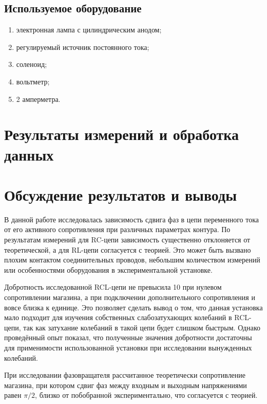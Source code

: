 \documentclass[a4paper, 12pt]{article}
\begin{document}
\subsection{Используемое оборудование}

\begin{enumerate}
    \item электронная лампа с цилиндрическим анодом;
    \item регулируемый источник постоянного тока;
    \item соленоид;
    \item вольтметр;
    \item 2 амперметра.
\end{enumerate}

\section{Результаты измерений и обработка данных}



\section{Обсуждение результатов и выводы}

В данной работе исследовалась зависимость сдвига фаз в цепи переменного тока от его активного сопротивления при различных параметрах контура. По результатам измерений для RC-цепи зависимость существенно отклоняется от теоретической, а для RL-цепи согласуется с теорией. Это может быть вызвано плохим контактом соединительных проводов, небольшим количеством измерений или особенностями оборудования в экспериментальной установке.

Добротность исследованной RCL-цепи не превысила 10 при нулевом сопротивлении магазина, а при подключении дополнительного сопротивления и вовсе близка к единице. Это позволяет сделать вывод о том, что данная установка мало подходит для изучения собственных слабозатухающих колебаний в RCL-цепи, так как затухание колебаний в такой цепи будет слишком быстрым. Однако проведённый опыт показал, что полученные значения добротности достаточны для применимости использованной установки при исследовании вынужденных колебаний.

При исследовании фазовращателя рассчитанное теоретически сопротивление магазина, при котором сдвиг фаз между входным и выходным напряжениями равен $\pi/2$, близко от побобранной экспериментально, что согласуется с теорией.
\end{document}
